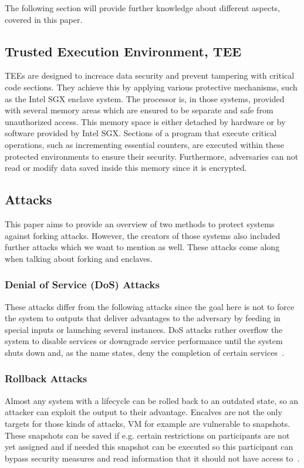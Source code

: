 
The following section will provide further knowledge about different aspects, covered in this paper.

\subsection{Trusted Execution Environment, TEE}

TEEs are designed to increace data security and prevent tampering with critical code sections. They achieve this by applying various protective mechanisms, such as the Intel SGX enclave system. The processor is, in those systems, provided with several memory areas which are ensured to be separate and safe from unauthorized access. This memory space is either detached by hardware or by software provided by Intel SGX. Sections of a program that execute critical operations, such as incrementing essential counters, are executed within these protected environments to ensure their security.
Furthermore, adversaries can not read or modify data saved inside this memory since it is encrypted.

\subsection{Attacks}

This paper aims to provide an overview of two methods to protect systems against forking attacks. However, the creators of those systems also included further attacks which we want to mention as well. These attacks come along when talking about forking and enclaves.

\subsubsection{Denial of Service (DoS) Attacks}
These attacks differ from the following attacks since the goal here is not to force the system to outputs that deliver advantages to the adversary by feeding in special inputs or launching several instances. DoS attacks rather overflow the system to disable services or downgrade service performance until the system shuts down and, as the name states, deny the completion of certain services~\cite{DoS}.

\subsubsection{Rollback Attacks}
Almost any system with a lifecycle can be rolled back to an outdated state, so an attacker can exploit the output to their advantage. Encalves are not the only targets for those kinds of attacks, VM for example are vulnerable to snapshots. These snapshots can be saved if e.g. certain restrictions on participants are not yet assigned and if needed this snapshot can be executed so this participant can bypass security measures and read information that it should not have access to~\cite{Rollback}. 

